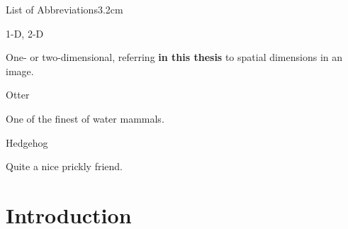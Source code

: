 \documentclass[a4paper, nobind]{templates/ociamthesis}
\begin{document}
\begin{romanpages}
  \dominitoc %

\flushbottom

\tableofcontents

\listoffigures
	\mtcaddchapter

\listoftables
  \mtcaddchapter
\begin{mclistof}{List of Abbreviations}{3.2cm}

\item[1-D, 2-D]

One- or two-dimensional, referring \textbf{in this thesis} to spatial dimensions in an image.

\item[Otter]

One of the finest of water mammals.

\item[Hedgehog]

Quite a nice prickly friend.

\end{mclistof} 


\end{romanpages}

\flushbottom

\hypertarget{introduction}{%
\chapter*{Introduction}\label{introduction}}
\end{document}
